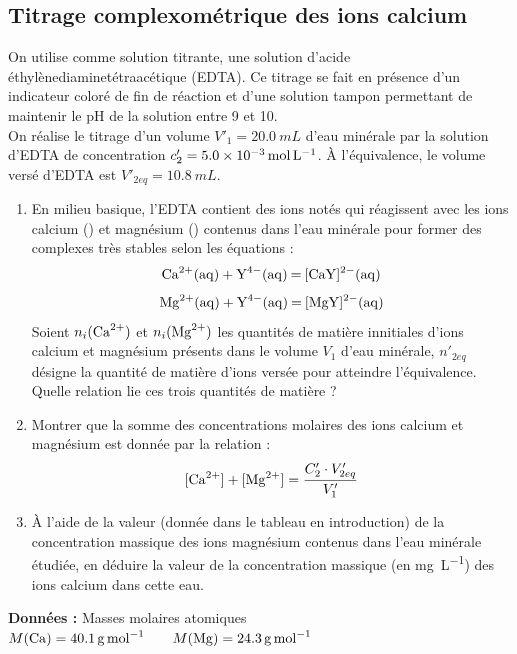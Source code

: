 \documentclass[a4paper,14pt,fleqn]{article}%
\begin{document}
\subsection{Titrage complexométrique des ions calcium}
    On utilise comme solution titrante, une solution d'acide éthylènediaminetétraacétique (EDTA). Ce titrage se fait en présence d'un indicateur coloré de fin de réaction et d'une solution tampon permettant de maintenir le pH de la solution entre 9 et 10.\\
    On réalise le titrage d'un volume $V'_1 = \SI{20,0}{mL}$ d'eau minérale par la solution d'EDTA de concentration $c'_2 = \SI{5,0E-3}{\mole\per\liter}$. À l'équivalence, le volume versé d'EDTA est $V'_{2eq} =\SI{10,8}{mL}$.
\begin{enumerate}[resume]
    \item En milieu basique, l'EDTA contient des ions notés  qui réagissent avec les ions calcium () et magnésium () contenus dans l'eau minérale pour former des complexes très stables selon les équations :
    $$\ce{Ca^2+(aq) + Y^4-(aq) = [CaY]^2-(aq)}$$
    $$\ce{Mg^2+(aq) + Y^4-(aq) = [MgY]^2-(aq)}$$
    Soient $n_i(\ce{Ca^2+})$ et $n_i(\ce{Mg^2+})$ les quantités de matière innitiales d'ions calcium et magnésium présents dans le volume $V_1$ d'eau minérale, $n'_{2eq}$ désigne la quantité de matière d'ions  versée pour atteindre l'équivalence.\\
    Quelle relation lie ces trois quantités de matière ?
    \item Montrer que la somme des concentrations molaires des ions calcium et magnésium est donnée par la relation : $$[\ce{Ca^2+}] + [\ce{Mg^2+}] = \dfrac{C'_2 \cdot V'_{2eq}}{V'_1}$$
    \item À l'aide de la valeur (donnée dans le tableau en introduction) de la concentration massique des ions magnésium contenus dans l'eau minérale étudiée, en déduire la valeur de la concentration massique (en \unit{\milli\gram\per\liter}) des ions calcium dans cette eau.
\end{enumerate}
\textbf{Données : } Masses molaires atomiques $M(\ce{Ca}) = \SI{40,1}{\gram\per\mole} \hspace{2em} M(\ce{Mg}) = \SI{24,3}{\gram\per\mole}$

\newpage
\end{document}

